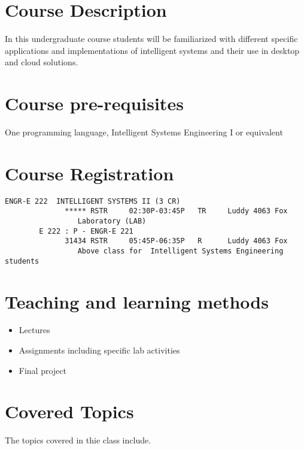 \section{Course Description}

In this undergraduate course students will be familiarized with
different specific applications and implementations of intelligent
systems and their use in desktop and cloud solutions.

\section{Course pre-requisites}

One programming language, Intelligent Systems Engineering I or equivalent

\section{Course Registration}


\begin{verbatim}
ENGR-E 222  INTELLIGENT SYSTEMS II (3 CR)
              ***** RSTR     02:30P-03:45P   TR     Luddy 4063 Fox
                 Laboratory (LAB)
        E 222 : P - ENGR-E 221
              31434 RSTR     05:45P-06:35P   R      Luddy 4063 Fox
                 Above class for  Intelligent Systems Engineering students

\end{verbatim}        


\section{Teaching and learning methods}


\begin{itemize}
\item Lectures
\item Assignments including specific lab activities
\item Final project 
\end{itemize}

\section{Covered Topics}

The topics covered in thie class include.

